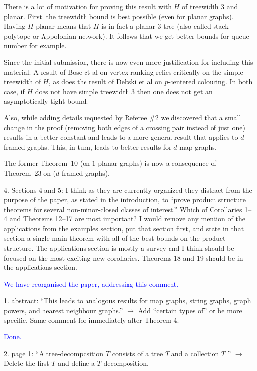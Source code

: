 \documentclass[12pt]{article}
\newcommand{\done}{\textcolor{blue}{Done.}}
\newenvironment{response}{\color{blue}}{}
\begin{document}
\begin{response}
There is a lot of motivation for proving this result with $H$ of treewidth 3 and planar. First, the treewidth bound is best possible (even for planar graphs). Having $H$ planar means that $H$ is in fact a planar 3-tree (also called stack polytope or Appolonian network). It follows that we get better bounds for queue-number for example. 
	
Since the initial submission, there is now even more justification for including this material.  A result of Bose et al on vertex ranking relies critically on the simple treewidth of $H$, as does the result of Debski et al on $p$-centered colouring.  In both case, if $H$ does not have simple treewidth $3$ then one does not get an asymptotically tight bound.
  
Also, while adding details requested by Referee \#2 we discovered that a small change in the proof (removing both edges of a crossing pair instead of just one) results in a better constant and leads to a more general result that applies to $d$-framed graphs. This, in turn, leads to better results for $d$-map graphs.
  
The former Theorem~10 (on $1$-planar graphs) is now a consequence of  Theorem~23 on ($d$-framed graphs).
\end{response}


4. Sections 4 and 5: I think as they are currently organized they distract from the purpose of the paper, as stated in the introduction, to ``prove product structure theorems for several non-minor-closed classes of interest.'' Which of Corollaries 1--4 and Theorems 12--17 are most important? I would remove any mention of the applications from the examples section, put that section first, and state in that section a single main theorem with all of the best bounds on the product structure. The applications section is mostly a survey and I think should be focused on the most exciting new corollaries. Theorems 18 and 19 should be in the applications section.

\textcolor{blue}{We have reorganised the paper, addressing this comment. }

1. abstract: ``This leads to analogous results for map graphs, string graphs, graph powers, and nearest neighbour graphs.'' $\longrightarrow$
Add ``certain types of'' or be more specific. Same comment for immediately after Theorem 4.

\done

2. page 1: ``A tree-decomposition $T$ consists of a tree $T$ and a collection
$T$ '' $\longrightarrow$ Delete the first $T$ and define a $T$-decomposition.
\end{document}
